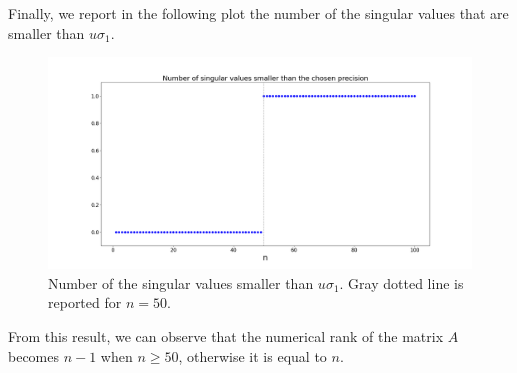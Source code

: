 \documentclass[a4paper,11pt]{article}
\begin{document}
\noindent Finally, we report in the following plot the number of the singular values that are smaller than $u\sigma_{1}$.

\begin{figure}[H]
	\centering
	\includegraphics[scale=0.25]{Plot/singular_values_precision}
	\caption{Number of the singular values smaller than $u\sigma_{1}$. Gray dotted line is reported for $n=50$.}
	\label{fig:singular_values_precision}
\end{figure}
\noindent From this result, we can observe that the numerical rank of the matrix $A$ becomes $n-1$ when $n\ge50$, otherwise it is equal to $n$.
\end{document}
